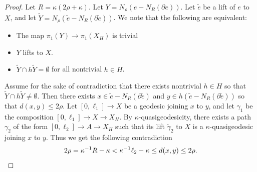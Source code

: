 \documentclass[10pt,a4paper]{amsart}
\newcommand{\ii}{^{-1}}
\newcommand{\tild}[1]{\widetilde{#1}}
\begin{document}
\begin{proof}
    Let $R=\kappa(2\rho+\kappa)$.
    Let $Y=N_\rho(e-N_{R}(\partial e))$. 
    Let $\tilde e$ be a lift of  $e$ to $X$, and let $\tild Y = N_\rho(\tild e-N_{R}(\partial \tild e))$. 
    We note that the following are equivalent: 
    \begin{itemize}
        \item The map $\pi_1(Y) \to \pi_1(X_H)$ is trivial
        \item $Y$ lifts to $X$.
        \item $\tild Y\cap h\tild Y= \emptyset$ for all nontrivial $h\in H$.
    \end{itemize} 
    Assume for the sake of contradiction that there exists nontrivial $h\in H$ so that $\tild Y\cap h\tild Y\neq \emptyset.$
    Then there exists $x\in \tilde e - N_R(\partial \tilde e)$ and $y\in h(\tilde e - N_R(\partial \tilde e))$ so that $d(x,y)\leq 2\rho$.
    Let $[0,\ell_1]\to X$ be a geodesic joining $x$ to $y$, and let $\gamma_1$ be the composition $[0,\ell_1]\to X\to X_H$.
    By $\kappa$-quasigeodesicity, there exists a path $\gamma_2$ of the form $[0,\ell_2]\to A\to X_H$ such that its lift $\tild \gamma_2$ to $X$ is a $\kappa$-quasigeodesic joining $x$ to $y$.
    Thus we get the following contradiction
    $$2\rho=\kappa\ii R-\kappa < \kappa\ii \ell_2 -\kappa\le d(x,y)\le 2\rho. \qedhere$$
\end{proof}
\end{document}
